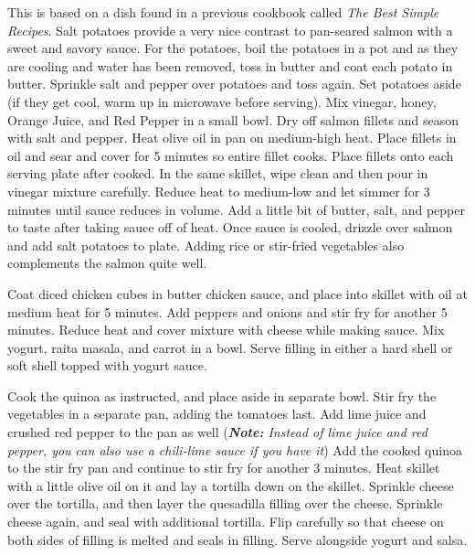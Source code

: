 \documentclass[oneside]{recipe}
\begin{document}
This is based on a dish found in a previous cookbook called \textit{The Best Simple Recipes}. Salt potatoes provide a very nice contrast to pan-seared salmon with a sweet and savory sauce. For the potatoes, boil the potatoes in a pot and as they are cooling and water has been removed, toss in butter and coat each potato in butter. Sprinkle salt and pepper over potatoes and toss again. Set potatoes aside (if they get cool, warm up in microwave before serving). Mix vinegar, honey, Orange Juice, and Red Pepper in a small bowl. Dry off salmon fillets and season with salt and pepper. Heat olive oil in pan on medium-high heat. Place fillets in oil and sear and cover for 5 minutes so entire fillet cooks. Place fillets onto each serving plate after cooked. In the same skillet, wipe clean and then pour in vinegar mixture carefully. Reduce heat to medium-low and let simmer for 3 minutes until sauce reduces in volume. Add a little bit of butter, salt, and pepper to taste after taking sauce off of heat. Once sauce is cooled, drizzle over salmon and add salt potatoes to plate. Adding rice or stir-fried vegetables also complements the salmon quite well. 



Coat diced chicken cubes in butter chicken sauce, and place into skillet with oil at medium heat for 5 minutes. Add peppers and onions and stir fry for another 5 minutes. Reduce heat and cover mixture with cheese while making sauce.
Mix yogurt, raita masala, and carrot in a bowl. Serve filling in either a hard shell or soft shell topped with yogurt sauce. 


Cook the quinoa as instructed, and place aside in separate bowl. Stir fry the vegetables in a separate pan, adding the tomatoes last. Add lime juice and crushed red pepper to the pan as well (\textit{\textbf{Note: } Instead of lime juice and red pepper, you can also use a chili-lime sauce if you have it}) Add the cooked quinoa to the stir fry pan and continue to stir fry for another 3 minutes. Heat skillet with a little olive oil on it and lay a tortilla down on the skillet. Sprinkle cheese over the tortilla, and then layer the quesadilla filling over the cheese. Sprinkle cheese again, and seal with additional tortilla. Flip carefully so that cheese on both sides of filling is melted and seals in filling. Serve alongside yogurt and salsa. 
\end{document}
